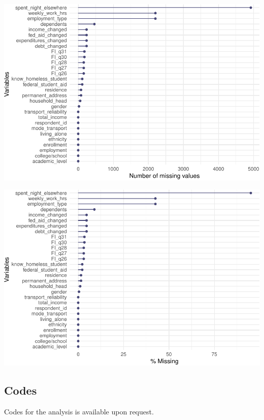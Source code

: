 \documentclass[
  10pt,
]{article}
\begin{document}
\begin{center}\includegraphics{phase2_report_files/figure-latex/unnamed-chunk-28-2} \end{center}

\begin{center}\includegraphics{phase2_report_files/figure-latex/unnamed-chunk-28-3} \end{center}

\hypertarget{codes}{%
\subsection{Codes}\label{codes}}

Codes for the analysis is available upon request.

\newpage{}
\end{document}
